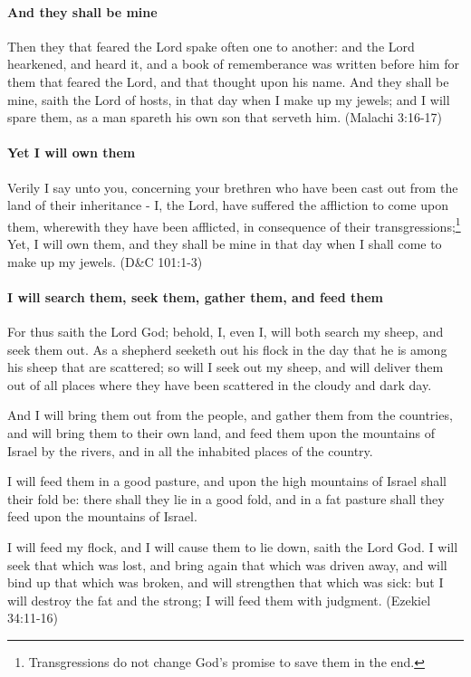 \paragraph{And they shall be mine}
Then they that feared the Lord spake often one to another: and the Lord hearkened, and heard it, and a book of rememberance was written before him for them that feared the Lord, and that thought upon his name. And they shall be mine, saith the Lord of hosts, in that day when I make up my jewels; and I will spare them, as a man spareth his own son that serveth him. (Malachi 3:16-17)

\paragraph{Yet I will own them}
Verily I say unto you, concerning your brethren who have been cast out from the land of their inheritance - I, the Lord, have suffered the affliction to come upon them, wherewith they have been afflicted, in consequence of their transgressions;\footnote{Transgressions do not change God's promise to save them in the end.} Yet, I will own them, and they shall be mine in that day when I shall come to make up my jewels. (D\&C 101:1-3)

\paragraph{I will search them, seek them, gather them, and feed them}
For thus saith the Lord God; behold, I, even I, will both search my sheep, and seek them out. As a shepherd seeketh out his flock in the day that he is among his sheep that are scattered; so will I seek out my sheep, and will deliver them out of all places where they have been scattered in the cloudy and dark day.

And I will bring them out from the people, and gather them from the countries, and will bring them to their own land, and feed them upon the mountains of Israel by the rivers, and in all the inhabited places of the country. 

I will feed them in a good pasture, and upon the high mountains of Israel shall their fold be: there shall they lie in a good fold, and in a fat pasture shall they feed upon the mountains of Israel.

I will feed my flock, and I will cause them to lie down, saith the Lord God. I will seek that which was lost, and bring again that which was driven away, and will bind up that which was broken, and will strengthen that which was sick: but I will destroy the fat and the strong; I will feed them with judgment. (Ezekiel 34:11-16)

